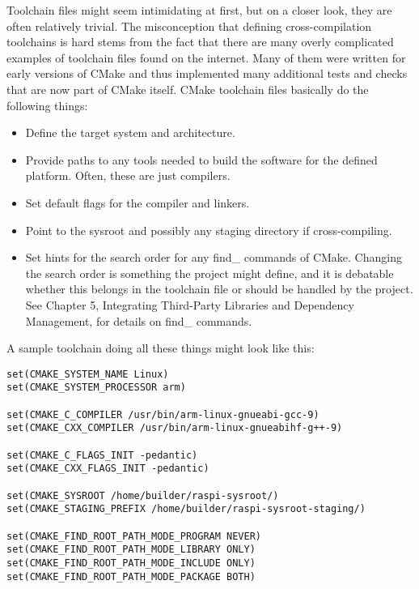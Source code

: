 

Toolchain files might seem intimidating at first, but on a closer look, they are often relatively trivial. The misconception that defining cross-compilation toolchains is hard stems from the fact that there are many overly complicated examples of toolchain files found on the internet. Many of them were written for early versions of CMake and thus implemented many additional tests and checks that are now part of CMake itself. CMake toolchain files basically do the following things:

\begin{itemize}
\item 
Define the target system and architecture.

\item 
Provide paths to any tools needed to build the software for the defined platform. Often, these are just compilers.

\item 
Set default flags for the compiler and linkers.

\item 
Point to the sysroot and possibly any staging directory if cross-compiling.

\item 
Set hints for the search order for any find\_ commands of CMake. Changing the search order is something the project might define, and it is debatable whether this belongs in the toolchain file or should be handled by the project. See Chapter 5, Integrating Third-Party Libraries and Dependency Management, for details on find\_ commands.
\end{itemize}

A sample toolchain doing all these things might look like this:

\begin{lstlisting}[style=styleCMake]
set(CMAKE_SYSTEM_NAME Linux)
set(CMAKE_SYSTEM_PROCESSOR arm)

set(CMAKE_C_COMPILER /usr/bin/arm-linux-gnueabi-gcc-9)
set(CMAKE_CXX_COMPILER /usr/bin/arm-linux-gnueabihf-g++-9)

set(CMAKE_C_FLAGS_INIT -pedantic)
set(CMAKE_CXX_FLAGS_INIT -pedantic)

set(CMAKE_SYSROOT /home/builder/raspi-sysroot/)
set(CMAKE_STAGING_PREFIX /home/builder/raspi-sysroot-staging/)

set(CMAKE_FIND_ROOT_PATH_MODE_PROGRAM NEVER)
set(CMAKE_FIND_ROOT_PATH_MODE_LIBRARY ONLY)
set(CMAKE_FIND_ROOT_PATH_MODE_INCLUDE ONLY)
set(CMAKE_FIND_ROOT_PATH_MODE_PACKAGE BOTH)
\end{lstlisting}

